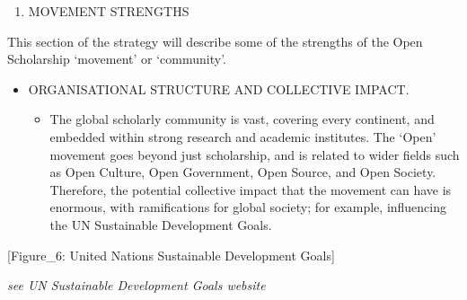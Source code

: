\documentclass[]{article}
\providecommand{\tightlist}{%
  \setlength{\itemsep}{0pt}\setlength{\parskip}{0pt}}
\begin{document}
\begin{enumerate}
\def\labelenumi{\arabic{enumi}.}
\setcounter{enumi}{5}
\tightlist
\item
  MOVEMENT STRENGTHS
\end{enumerate}

This section of the strategy will describe some of the strengths of the
Open Scholarship `movement' or `community'.

\begin{itemize}
\item
  ORGANISATIONAL STRUCTURE AND COLLECTIVE IMPACT.

  \begin{itemize}
  \tightlist
  \item
    The global scholarly community is vast, covering every continent,
    and embedded within strong research and academic institutes. The
    `Open' movement goes beyond just scholarship, and is related to
    wider fields such as Open Culture, Open Government, Open Source, and
    Open Society. Therefore, the potential collective impact that the
    movement can have is enormous, with ramifications for global
    society; for example, influencing the UN Sustainable Development
    Goals.
  \end{itemize}
\end{itemize}

{[}Figure\_6: United Nations Sustainable Development Goals{]}

\emph{see UN Sustainable Development Goals website}
\end{document}
